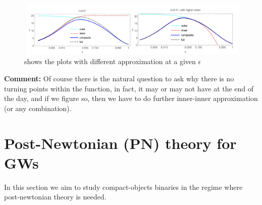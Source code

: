 \documentclass[a4paper, 12pt]{article}
\begin{document}
\begin{figure}[h!]
\begin{center}
  \includegraphics[scale=0.5]{Figures/levelmatched.png}
\end{center}
\caption{shows the plots with different approximation at a given \( \epsilon \)}
\label{fig:levelmatched}
\end{figure}







\textbf{Comment: }
Of course there is the natural question to ask why there is no turning
points within the function, in fact, it may or may not have at the end of
the day, and if we figure so, then we have to do further inner-inner
approximation (or
any combination).



  \section{Post-Newtonian (PN) theory for GWs}%
    \label{sec:Post-Newtonian (PN) theory for GWs}
    In this section we aim to study compact-objects binaries in the
    regime where post-newtonian theory is needed. 
\end{document}
